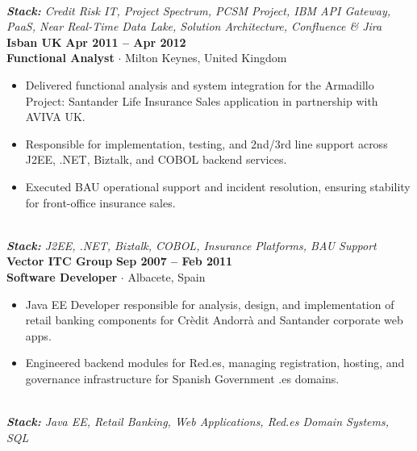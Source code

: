 \documentclass[10pt,a4paper]{article}
\begin{document}
\\\noindent\textit{\footnotesize \textbf{Stack:} Credit Risk IT, Project Spectrum, PCSM Project, IBM API Gateway, PaaS, Near Real-Time Data Lake, Solution Architecture, Confluence \& Jira}
\vspace{10pt}
\noindent\textbf{\large Isban UK} \hfill {\color{SynthBlue}\textbf{Apr 2011 -- Apr 2012}} \\
{\color{SynthPink}\textbf{Functional Analyst}} $\cdot$ {\color{SlateGray}Milton Keynes, United Kingdom}
\begin{itemize}[leftmargin=1.5em, itemsep=1.5pt, topsep=2pt]
    \item Delivered functional analysis and system integration for the Armadillo Project: Santander Life Insurance Sales application in partnership with AVIVA UK.
    \item Responsible for implementation, testing, and 2nd/3rd line support across J2EE, .NET, Biztalk, and COBOL backend services.
    \item Executed BAU operational support and incident resolution, ensuring stability for front-office insurance sales.
\end{itemize}
\\\noindent\textit{\footnotesize \textbf{Stack:} J2EE, .NET, Biztalk, COBOL, Insurance Platforms, BAU Support}
\vspace{10pt}
\noindent\textbf{\large Vector ITC Group} \hfill {\color{SynthBlue}\textbf{Sep 2007 -- Feb 2011}} \\
{\color{SynthPink}\textbf{Software Developer}} $\cdot$ {\color{SlateGray}Albacete, Spain}
\begin{itemize}[leftmargin=1.5em, itemsep=1.5pt, topsep=2pt]
    \item Java EE Developer responsible for analysis, design, and implementation of retail banking components for Crèdit Andorrà and Santander corporate web apps.
    \item Engineered backend modules for Red.es, managing registration, hosting, and governance infrastructure for Spanish Government .es domains.
\end{itemize}
\\\noindent\textit{\footnotesize \textbf{Stack:} Java EE, Retail Banking, Web Applications, Red.es Domain Systems, SQL}
\vspace{10pt}


\end{document}
